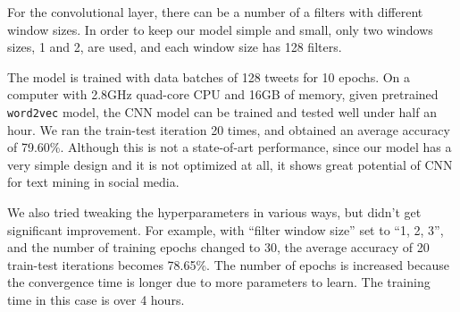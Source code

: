 For the convolutional layer, there can be a number of a filters with different window sizes. In order to keep our model simple and small, only two windows sizes, 1 and 2, are used, and each window size has 128 filters. 

The model is trained with data batches of 128 tweets for 10 epochs. On a computer with 2.8GHz quad-core CPU and 16GB of memory, given pretrained {\tt word2vec} model, the CNN model can be trained and tested well under half an hour. We ran the train-test iteration 20 times, and obtained an average accuracy of 79.60\%. Although this is not a state-of-art performance, since our model has a very simple design and it is not optimized at all, it shows great potential of CNN for text mining in social media.

We also tried tweaking the hyperparameters in various ways, but didn't get significant improvement. For example, with ``filter window size'' set to ``1, 2, 3'', and the number of training epochs changed to 30, the average accuracy of 20 train-test iterations becomes 78.65\%. The number of epochs is increased because the convergence time is longer due to more parameters to learn. The training time in this case is over 4 hours. 